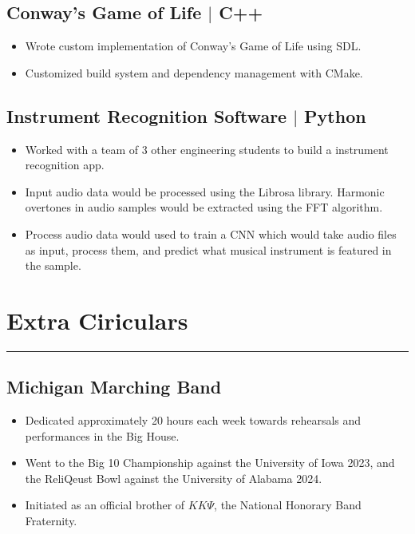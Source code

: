 \documentclass[10pt, letterpaper]{article}
\begin{document}
\subsection*{Conway's Game of Life $\vert$ C++}
\begin{itemize}[noitemsep]
	\item Wrote custom implementation of Conway's Game of Life using SDL.
	\item Customized build system and dependency management with CMake.
\end{itemize}

\subsection*{Instrument Recognition Software $\vert$ Python}
\begin{itemize}[noitemsep]
	\item Worked with a team of 3 other engineering students to build a instrument recognition app.
	\item Input audio data would be processed using the Librosa library. Harmonic overtones in audio samples would be extracted using the FFT algorithm.
	\item Process audio data would used to train a CNN which would take audio files as input, process them,
	and predict what musical instrument is featured in the sample.
\end{itemize}

\section*{Extra Ciriculars}
\hrule
\vspace{7pt}

\subsection*{Michigan Marching Band}
\begin{itemize}[noitemsep]
	\item Dedicated approximately 20 hours each week towards rehearsals and performances in the Big House.
	\item Went to the Big 10 Championship against the University of Iowa 2023,
		and the ReliQeust Bowl against the University of Alabama 2024.
	\item Initiated as an official brother of $K K\Psi$, the National Honorary Band Fraternity.
\end{itemize}
\end{document}
